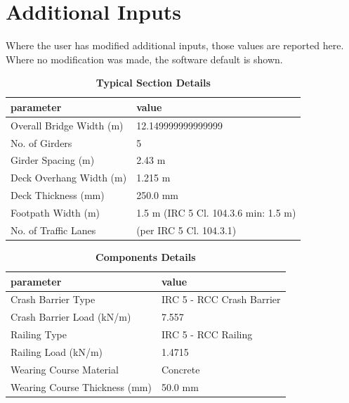 \documentclass[12pt,a4paper]{report}
\numberwithin{table}{chapter}
\numberwithin{figure}{chapter}
\begin{document}
\newpage
\section{Additional Inputs}
\label{sec:additional-inputs}

Where the user has modified additional inputs, those values are reported here. Where no modification was made, the software default is shown.

\vspace{0.8cm}

\begin{longtable}{|L{5.5cm}|p{10.0cm}|}
\caption{\textbf{Typical Section Details}}
\hline
\textbf{parameter} & \textbf{value} \\
\hline
\textnormal{Overall Bridge Width (m)} & 12.149999999999999 \\[6pt]
\hline
\textnormal{No. of Girders} & 5 \\[6pt]
\hline
\textnormal{Girder Spacing (m)} & 2.43 m \\[6pt]
\hline
\textnormal{Deck Overhang Width (m)} & 1.215 m \\[6pt]
\hline
\textnormal{Deck Thickness (mm)} & 250.0 mm \\[6pt]
\hline
\textnormal{Footpath Width (m)} & 1.5 m (IRC 5 Cl. 104.3.6 min: 1.5 m) \\[6pt]
\hline
\textnormal{No. of Traffic Lanes} &  (per IRC 5 Cl. 104.3.1) \\[6pt]
\hline
\end{longtable}

\vspace{0.8em}

\begin{longtable}{|L{5.5cm}|p{10.0cm}|}
\caption{\textbf{Components Details}}
\hline
\textbf{parameter} & \textbf{value} \\
\hline
\textnormal{Crash Barrier Type} & IRC 5 - RCC Crash Barrier \\[6pt]
\hline
\textnormal{Crash Barrier Load (kN/m)} & 7.557 \\[6pt]
\hline

\textnormal{Railing Type} & IRC 5 - RCC Railing \\[6pt]
\hline
\textnormal{Railing Load (kN/m)} & 1.4715 \\[6pt]
\hline
\textnormal{Wearing Course Material} & Concrete \\[6pt]
\hline
\textnormal{Wearing Course Thickness (mm)} & 50.0 mm \\[6pt]
\hline
\end{longtable}
\end{document}
